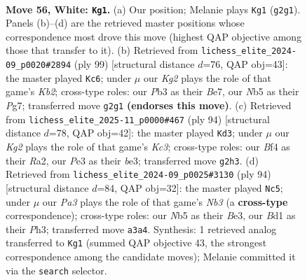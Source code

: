 \documentclass[11pt]{article}
\begin{document}
\clearpage

\begin{figure}[p]\centering
\begin{subfigure}{0.46\textwidth}\centering
\resizebox{\linewidth}{!}{%
\newchessgame
\chessboard[
  setfen={n7/1p1n3k/1b6/pN1p3b/5B1p/PP2P3/4P1K1/3B4 w - - 8 56},
  showmover=false,
  pgfstyle=straightmove, color=movearrow, markmove={g2-g1}
]}
\caption{}
\end{subfigure}\hfill
\begin{subfigure}{0.46\textwidth}\centering
\resizebox{\linewidth}{!}{%
\newchessgame
\chessboard[
  setfen={8/1k2b1p1/4p3/3pP3/2bP2P1/1p4K1/2n2B2/1R1N4 b - - 7 50},
  showmover=false,
  pgfstyle=straightmove, color=movearrow, markmove={b7-c6}
]}
\caption{}
\end{subfigure}
\\[4pt]
\begin{subfigure}{0.46\textwidth}\centering
\resizebox{\linewidth}{!}{%
\newchessgame
\chessboard[
  setfen={8/2r1k3/1p4p1/1P1B3p/2P1N1n1/2K1b1P1/R7/8 w - - 7 48},
  showmover=false,
  pgfstyle=straightmove, color=movearrow, markmove={c3-d3}
]}
\caption{}
\end{subfigure}\hfill
\begin{subfigure}{0.46\textwidth}\centering
\resizebox{\linewidth}{!}{%
\newchessgame
\chessboard[
  setfen={b3n1k1/2b3p1/p6p/1p3p2/1P2PP2/PN2BK1P/8/1B6 w - - 0 48},
  showmover=false,
  pgfstyle=straightmove, color=movearrow, markmove={b3-c5}
]}
\caption{}
\end{subfigure}
\caption{\textbf{Move 56, White: \texttt{Kg1}.} (a) Our position; Melanie plays \texttt{Kg1} (\texttt{g2g1}). Panels (b)--(d) are the retrieved master positions whose correspondence most drove this move (highest QAP objective among those that transfer to it). (b) Retrieved from \texttt{lichess\_elite\_2024-09\_p0020\#2894} (ply 99) [structural distance $d$=76, QAP obj=43]: the master played \texttt{Kc6}; under $\mu$ our \emph{Kg2} plays the role of that game's \emph{Kb2}; cross-type roles: our \emph{P}b3 as their \emph{B}e7, our \emph{N}b5 as their \emph{P}g7; transferred move \texttt{g2g1} \textbf{(endorses this move)}. (c) Retrieved from \texttt{lichess\_elite\_2025-11\_p0000\#467} (ply 94) [structural distance $d$=78, QAP obj=42]: the master played \texttt{Kd3}; under $\mu$ our \emph{Kg2} plays the role of that game's \emph{Kc3}; cross-type roles: our \emph{B}f4 as their \emph{R}a2, our \emph{P}e3 as their \emph{b}e3; transferred move \texttt{g2h3}. (d) Retrieved from \texttt{lichess\_elite\_2024-09\_p0025\#3130} (ply 94) [structural distance $d$=84, QAP obj=32]: the master played \texttt{Nc5}; under $\mu$ our \emph{Pa3} plays the role of that game's \emph{Nb3} (a \textbf{cross-type} correspondence); cross-type roles: our \emph{N}b5 as their \emph{B}e3, our \emph{B}d1 as their \emph{P}h3; transferred move \texttt{a3a4}. Synthesis: 1 retrieved analog transferred to \texttt{Kg1} (summed QAP objective 43, the strongest correspondence among the candidate moves); Melanie committed it via the \texttt{search} selector.}
\label{fig:thought-m110}
\end{figure}
\end{document}
